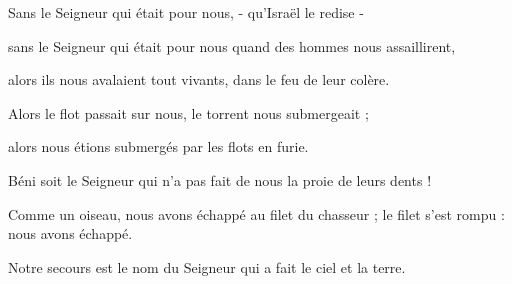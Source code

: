 \item Sans le Seigneur qui était pour nous, - qu'Israël le redise -

\item sans le Seigneur qui était pour nous quand des hommes nous assaillirent,

\item alors ils nous avalaient tout vivants, dans le feu de leur colère.

\item Alors le flot passait sur nous, le torrent nous submergeait ;

\item alors nous étions submergés par les flots en furie.

\item Béni soit le Seigneur qui n'a pas fait de nous la proie de leurs dents !

\item Comme un oiseau, nous avons échappé au filet du chasseur ; le filet s'est rompu : nous avons échappé.

\item Notre secours est le nom du Seigneur qui a fait le ciel et la terre.
